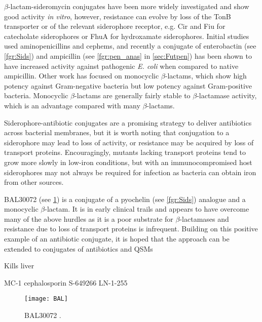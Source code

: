 $\beta$-lactam-sideromycin conjugates have been more widely investigated\cite{Page2013} and show good activity \textit{in vitro}, however, resistance can evolve by loss of the TonB transporter or of the relevant siderophore receptor, e.g. Cir and Fiu for catecholate siderophores or FhuA for hydroxamate siderophores. Initial studies used aminopenicillins and cephems, and recently a conjugate of enterobactin (see \ref{fgr:Sids}) and ampicillin (see \ref{fgr:pen_anas} in \ref{sec:Futpen}) has been shown to have increased activity against pathogenic \textit{E. coli} when compared to native ampicillin\cite{Zheng2014}. Other work has focused on monocyclic $\beta$-lactams, which show high potency against Gram-negative bacteria but low potency against Gram-positive bacteria\cite{Zurenko1990}. Monocyclic $\beta$-lactams are generally fairly stable to $\beta$-lactamase activity, which is an advantage compared with many $\beta$-lactams. 

Siderophore-antibiotic conjugates are a promising strategy to deliver antibiotics across bacterial membranes, but it is worth noting that conjugation to a siderophore may lead to loss of activity, or resistance may be acquired by loss of transport proteins. Encouragingly, mutants lacking transport proteins tend to grow more slowly in low-iron conditions, but with an immunocompromised host siderophores may not always be required for infection as bacteria can obtain iron from other sources\cite{Takase2000}. 

BAL30072  (see \ref{fgr:BAL}) is a conjugate of a pyochelin  (see \ref{fgr:Sids}) analogue and a monocyclic $\beta$-lactam. It is in early clinical trails and appears to have overcome many of the above hurdles as it is a poor substrate for $\beta$-lactamases and resistance due to loss of transport proteins is infrequent\cite{Page2013}. Building on this positive example of an antibiotic conjugate, it is hoped that the approach can be extended to conjugates of antibiotics and QSMs

Kills liver\cite{Paech2017}

MC-1\cite{Schalk2017,Tillotson2016}
cephalosporin S-649266\cite{Ito2018}
LN-1-255\cite{Pattanaik2009,Bou2010}

\begin{figure}[H]
	\begin{center}
		\texttt{[image: BAL]}
		\caption{BAL30072 . \label{fgr:BAL}}
	\end{center}
\end{figure}



